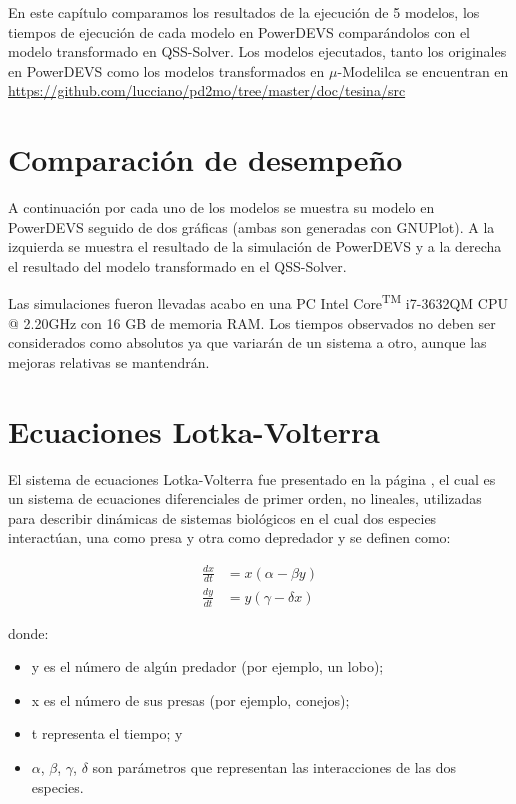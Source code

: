 	En este capítulo comparamos los resultados de la ejecución de 5 modelos, los tiempos de ejecución de cada modelo en PowerDEVS comparándolos con 
	el modelo transformado en QSS-Solver. 
	Los modelos ejecutados, tanto los originales en PowerDEVS como los modelos transformados en $\mu$-Modelilca se encuentran en 
	\url{https://github.com/lucciano/pd2mo/tree/master/doc/tesina/src}

\section{Comparación de desempeño}
	A continuación por cada uno de los modelos se muestra su modelo en PowerDEVS seguido de dos gráficas (ambas son generadas con GNUPlot). 
	A la izquierda se muestra el resultado de la simulación de PowerDEVS y a la derecha el resultado del modelo transformado en el QSS-Solver.

	Las simulaciones fueron llevadas acabo en una PC Intel\textsuperscript{\textregistered} Core\textsuperscript{TM} i7-3632QM CPU @ 2.20GHz con 16 GB de memoria RAM. Los tiempos observados no deben ser considerados como absolutos ya que variarán de un sistema a otro, aunque las mejoras relativas se mantendrán.


\section{Ecuaciones Lotka-Volterra}

	El sistema de ecuaciones Lotka-Volterra fue presentado en la página \pageref{lotka_volterra_ref}, el cual es un sistema de ecuaciones diferenciales de primer orden, no lineales, utilizadas para describir dinámicas de sistemas biológicos en el cual dos especies interactúan, una como presa y otra como depredador y se definen como:

\begin{align*}
\frac{dx}{dt} & = x(\alpha - \beta y)\\
\frac{dy}{dt} & =y(\gamma - \delta  x)
\end{align*}

donde:
\begin{itemize}
	\item y es el número de algún predador (por ejemplo, un lobo);
    \item x es el número de sus presas (por ejemplo, conejos);
    \item t representa el tiempo; y
    \item $\alpha$, $\beta$, $\gamma$, $\delta$ son parámetros que representan las interacciones de las dos especies.
\end{itemize}

